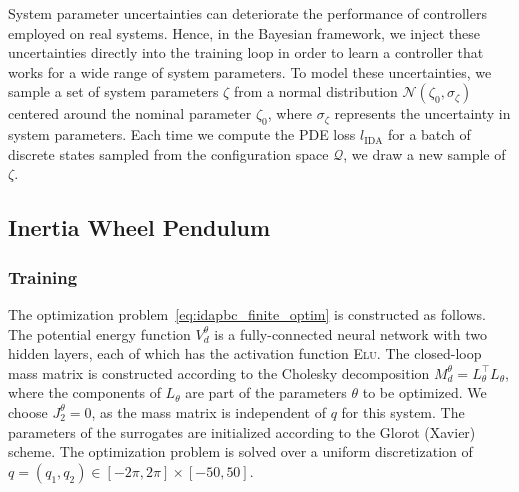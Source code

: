 System parameter uncertainties can deteriorate the performance of controllers
employed on real systems. 
%
Hence, in the Bayesian framework, we inject these uncertainties directly into
the training loop in order to learn a controller that works for a wide range of
system parameters.
%
To model these uncertainties, we sample a set of system parameters $\zeta$ from
a normal distribution $\mathcal{N}(\zeta_0, \sigma_{\zeta})$ centered around the
nominal parameter $\zeta_0$, where $\sigma_{\zeta}$ represents the uncertainty
in system parameters.
%
Each time we compute the PDE loss $l_{\text{IDA}}$ for a batch of discrete
states sampled from the configuration space $\mathcal{Q}$, we draw a new sample
of $\zeta$.


\subsection{Inertia Wheel Pendulum}

\subsubsection{Training}
The optimization problem~\eqref{eq:idapbc_finite_optim} is constructed as
follows. The potential energy function $V_d^\theta$ is a fully-connected neural
network with two hidden layers, each of which has the activation function
\textsc{Elu}.
%
The closed-loop mass matrix is constructed according to the Cholesky
decomposition $M_d^\theta = L^\top_\theta L_\theta$, where the components of
$L_\theta$ are part of the parameters $\theta$ to be optimized.
%
We choose $J_2^\theta = 0$, as the mass matrix is independent of $q$ for
this system.
%
The parameters of the surrogates are initialized according to the Glorot
(Xavier)~\cite{glorot2010understanding} scheme.
%
The optimization problem is solved over a uniform discretization of $q = \left(
q_1, q_2 \right) \in [-2\pi, 2\pi] \times [-50, 50]$.


